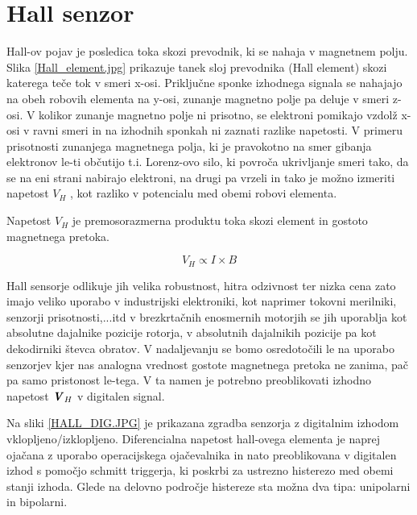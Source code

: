 \documentclass[a4paper,twoside,openright,12pt]{book}
\begin{document}
\section[Hall senzor]{Hall senzor}
Hall-ov pojav je posledica toka skozi prevodnik, ki se nahaja v magnetnem polju. Slika \ref{Hall_element.jpg} prikazuje tanek sloj prevodnika (Hall element) skozi katerega teče tok v smeri x-osi. Priključne sponke izhodnega signala se nahajajo na obeh robovih elementa na y-osi,  zunanje magnetno polje pa deluje v smeri z-osi. V kolikor zunanje magnetno polje ni prisotno, se elektroni pomikajo vzdolž x-osi v ravni smeri in na izhodnih sponkah ni zaznati razlike napetosti. V primeru prisotnosti zunanjega magnetnega polja, ki je pravokotno na smer gibanja elektronov le-ti občutijo t.i. Lorenz-ovo silo, ki povroča ukrivljanje smeri tako, da se na eni strani nabirajo elektroni, na drugi pa vrzeli in tako je možno izmeriti napetost  $V_H$ , kot razliko v potencialu med obemi robovi elementa. \cite{manual-Honeywell}


Napetost $V_H$ je premosorazmerna produktu toka skozi element in gostoto magnetnega pretoka.

\begin{equation}V_H \propto I\times B\end{equation}

Hall sensorje odlikuje jih velika robustnost, hitra odzivnost ter nizka cena zato imajo veliko uporabo v industrijski elektroniki, kot naprimer tokovni merilniki, senzorji prisotnosti,...itd v brezkrtačnih enosmernih motorjih se jih uporablja kot absolutne dajalnike pozicije rotorja, v absolutnih dajalnikih pozicije pa kot dekodirniki števca obratov. V nadaljevanju se bomo osredotočili le na uporabo senzorjev kjer nas analogna vrednost gostote magnetnega pretoka ne zanima, pač pa samo pristonost le-tega. V ta namen je potrebno preoblikovati  izhodno napetost  $\textbf{\textit{V}}_H$ v digitalen signal.

Na sliki \ref{HALL_DIG.JPG} je prikazana zgradba senzorja z digitalnim izhodom vklopljeno/izklopljeno. Diferencialna napetost hall-ovega elementa je naprej ojačana z uporabo operacijskega ojačevalnika in nato preoblikovana v digitalen izhod s pomočjo schmitt triggerja, ki poskrbi za ustrezno histerezo med obemi stanji izhoda.  Glede na delovno področje histereze sta možna dva tipa: unipolarni in bipolarni. 
\end{document}
